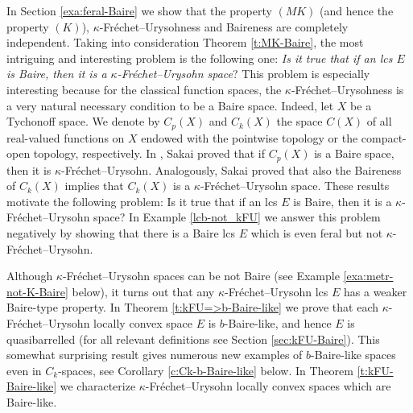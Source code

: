 \documentclass[preprint,11pt]{elsarticle}
\theoremstyle{definition}
\theoremstyle{remark}
\numberwithin{equation}{section}
\numberwithin{theorem}{section}
\newcommand{\CC}{C_k}
\begin{document}
In Section \ref{exa:feral-Baire} we show that the property $(MK)$ (and hence the property $(K)$), $\kappa$-Fr\'{e}chet--Urysohness and Baireness are completely independent. Taking into consideration Theorem \ref{t:MK-Baire}, the most intriguing and interesting problem is the following one: {\em Is it true that if an lcs $E$ is Baire, then it is a $\kappa$-Fr\'{e}chet--Urysohn space}? This problem is especially interesting because for the classical function spaces, the $\kappa$-Fr\'{e}chet--Urysohness is a very natural necessary condition to be a Baire space.
Indeed, let $X$ be a Tychonoff space. We denote by $C_p(X)$ and $\CC(X)$ the space $C(X)$ of all real-valued functions on $X$ endowed with the pointwise topology or the compact-open topology, respectively. In \cite[Proposition~2.6]{Sak2}, Sakai proved that if $C_p(X)$ is a Baire space, then it is $\kappa$-Fr\'{e}chet--Urysohn. Analogously, Sakai \cite[Proposition~2.5]{Sakai} proved that also the Baireness of $\CC(X)$ implies that $\CC(X)$ is a $\kappa$-Fr\'{e}chet--Urysohn space.
These results motivate the following problem: Is it true that if an lcs $E$ is Baire, then it is a $\kappa$-Fr\'{e}chet--Urysohn space? In Example  \ref{lcb-not_kFU}  we answer this problem negatively by showing that there is a Baire lcs $E$ which is even feral  but not $\kappa$-Fr\'{e}chet--Urysohn.




Although $\kappa$-Fr\'{e}chet--Urysohn spaces can be not Baire (see Example \ref{exa:metr-not-K-Baire} below), it turns out that any $\kappa$-Fr\'{e}chet--Urysohn lcs $E$ has a weaker Baire-type property. In Theorem \ref{t:kFU=>b-Baire-like} we prove that each $\kappa$-Fr\'{e}chet--Urysohn locally convex space $E$ is $b$-Baire-like, and hence $E$ is quasibarrelled (for all relevant definitions see Section \ref{sec:kFU-Baire}). This somewhat surprising result gives numerous new examples of $b$-Baire-like spaces even in $\CC$-spaces, see Corollary \ref{c:Ck-b-Baire-like} below. %
In Theorem \ref{t:kFU-Baire-like} we characterize $\kappa$-Fr\'{e}chet--Urysohn locally convex spaces which are Baire-like.
\end{document}
